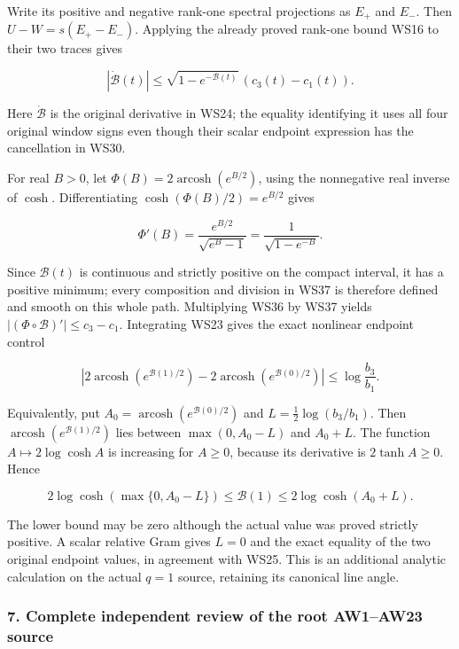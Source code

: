 Write its positive and negative rank-one spectral projections as \(E_+\) and \(E_-\). Then \(U-W=s(E_+-E_-)\). Applying the already proved rank-one bound WS16 to their two traces gives

\[
|\dot{\mathcal B}(t)|
\le\sqrt{1-e^{-\mathcal B(t)}}\,(c_3(t)-c_1(t)).
\tag{WS36}
\]

Here \(\dot{\mathcal B}\) is the original derivative in WS24; the equality identifying it uses all four original window signs even though their scalar endpoint expression has the cancellation in WS30.

For real \(B>0\), let \(\Phi(B)=2\operatorname{arcosh}(e^{B/2})\), using the nonnegative real inverse of \(\cosh\). Differentiating \(\cosh(\Phi(B)/2)=e^{B/2}\) gives

\[
\Phi'(B)=\frac{e^{B/2}}{\sqrt{e^B-1}}
=\frac1{\sqrt{1-e^{-B}}}.
\tag{WS37}
\]

Since \(\mathcal B(t)\) is continuous and strictly positive on the compact interval, it has a positive minimum; every composition and division in WS37 is therefore defined and smooth on this whole path. Multiplying WS36 by WS37 yields \(|(\Phi\circ\mathcal B)'|\le c_3-c_1\). Integrating WS23 gives the exact nonlinear endpoint control

\[
\boxed{
\left|2\operatorname{arcosh}(e^{\mathcal B(1)/2})
      -2\operatorname{arcosh}(e^{\mathcal B(0)/2})\right|
\le\log\frac{b_3}{b_1}.
}
\tag{WS38}
\]

Equivalently, put \(A_0=\operatorname{arcosh}(e^{\mathcal B(0)/2})\) and \(L=\tfrac12\log(b_3/b_1)\). Then \(\operatorname{arcosh}(e^{\mathcal B(1)/2})\) lies between \(\max(0,A_0-L)\) and \(A_0+L\). The function \(A\mapsto2\log\cosh A\) is increasing for \(A\ge0\), because its derivative is \(2\tanh A\ge0\). Hence

\[
2\log\cosh(\max\{0,A_0-L\})
\le\mathcal B(1)\le2\log\cosh(A_0+L).
\tag{WS39}
\]

The lower bound may be zero although the actual value was proved strictly positive. A scalar relative Gram gives \(L=0\) and the exact equality of the two original endpoint values, in agreement with WS25. This is an additional analytic calculation on the actual \(q=1\) source, retaining its canonical line angle.

\subsubsection{7. Complete independent review of the root AW1--AW23 source}\label{endpoint-window_review--complete-independent-review-of-the-root-aw1aw23-source}


